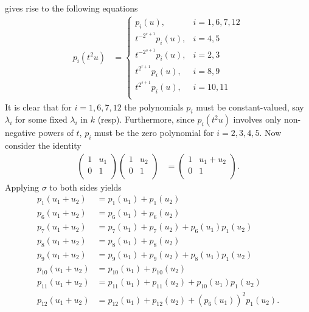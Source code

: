  gives rise to the following equations
 \begin{align}
 \label{tAct}
 p_i(t^2u) &= \left\{    \begin{array}{ll}
       p_i(u), & i = 1,6,7,12 \\
       t^{-2^{r+1}}p_i(u), & i = 4,5 \\
       t^{-2^{s+1}}p_i(u), & i = 2,3 \\
       t^{2^{r+1}}p_i(u), & i = 8,9 \\
       t^{2^{s+1}}p_i(u), & i = 10,11 \\
    \end{array}
 \right.
 \end{align}
It is clear that for $i = 1,6,7,12$ the polynomials $p_i$ must be constant-valued, say $\lambda_i$ for some fixed $\lambda_i$ in $k$ (resp). Furthermore, since $p_i(t^2u)$ involves only non-negative powers of $t$, $p_i$ must be the zero polynomial for $i=2,3,4,5$. Now consider the identity
\begin{align*}
  \left( \begin{matrix}
      1 & u_1 \\
      0 & 1 \\
   \end{matrix}\right)
   \left(\begin{matrix}
      1 & u_2 \\
      0 & 1 \\
   \end{matrix}\right) &=
    \left(\begin{matrix}
      1 & u_1 + u_2 \\
      0 & 1 \\
   \end{matrix}\right).
\end{align*}
Applying $\sigma$ to both sides yields
\begin{align*}
p_1(u_1 + u_2) &= p_1(u_1) + p_1(u_2) \\
p_6(u_1 + u_2) &= p_6(u_1) + p_6(u_2) \\
p_7(u_1 + u_2) &= p_7(u_1) + p_7(u_2) + p_6(u_1)p_1(u_2)\\
p_8(u_1 + u_2) &= p_8(u_1) + p_8(u_2) \\
p_9(u_1 + u_2) &= p_9(u_1) + p_9(u_2) + p_8(u_1)p_1(u_2)\\
p_{10}(u_1 + u_2) &= p_{10}(u_1) + p_{10}(u_2)\\
p_{11}(u_1 + u_2) &= p_{11}(u_1) + p_{11}(u_2) + p_{10}(u_1)p_1(u_2)\\
p_{12}(u_1 + u_2) &= p_{12}(u_1) + p_{12}(u_2) + \left(p_6(u_1)\right)^2p_1(u_2).
\end{align*}
